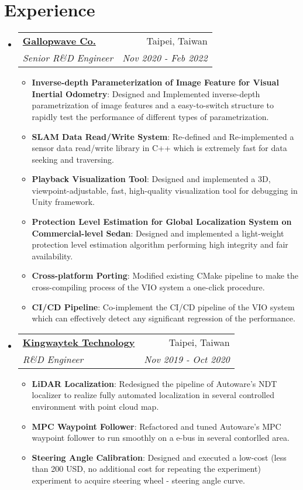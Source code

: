 \documentclass[a4paper,20pt]{article}
\makeatletter
\newcommand{\resumeItem}[2]{
  \item\small{
    \textbf{#1}{: #2 \vspace{-2pt}}
  }
}
\newcommand{\resumeSubheading}[4]{
  \vspace{-1pt}\item
    \begin{tabular*}{0.97\textwidth}{l@{\extracolsep{\fill}}r}
      \textbf{#1} & #2 \\
      \textit{#3} & \textit{#4} \\
    \end{tabular*}\vspace{-5pt}
}
\newcommand{\resumeSubHeadingListStart}{\begin{itemize}[leftmargin=*]}
\newcommand{\resumeSubHeadingListEnd}{\end{itemize}}
\newcommand{\resumeItemListStart}{\begin{itemize}}
\newcommand{\resumeItemListEnd}{\end{itemize}\vspace{-5pt}}
\makeatother
\begin{document}
\section{Experience}
  \resumeSubHeadingListStart
    \resumeSubheading{\href{https://www.gallopwave.com/}{Gallopwave Co.}}{Taipei, Taiwan}
      {Senior R\&D Engineer}{Nov 2020 - Feb 2022}
    \resumeItemListStart
        \resumeItem{Inverse-depth Parameterization of Image Feature for Visual Inertial Odometry}
          {Designed and Implemented inverse-depth parametrization of image features and a easy-to-switch structure to rapidly test the performance of different types of parametrization. }
        \resumeItem{SLAM Data Read/Write System}
          {Re-defined and Re-implemented a sensor data read/write library in C++ which is extremely fast for data seeking and traversing.}
        \resumeItem{Playback Visualization Tool}
          {Designed and implemented a 3D, viewpoint-adjustable, fast, high-quality visualization tool for debugging in Unity framework.}
        \resumeItem{Protection Level Estimation for Global Localization System on Commercial-level Sedan}
          {Designed and implemented a light-weight protection level estimation algorithm performing high integrity and fair availability.}
        \resumeItem{Cross-platform Porting}
          {Modified existing CMake pipeline to make the cross-compiling process of the VIO system a one-click procedure.}
        \resumeItem{CI/CD Pipeline}
          {Co-implement the CI/CD pipeline of the VIO system which can effectively detect any significant regression of the performance.}
      \resumeItemListEnd
    \resumeSubheading{\href{http://www.kingwaytek.com/}{Kingwaytek Technology}}{Taipei, Taiwan}
      {R\&D Engineer}{Nov 2019 - Oct 2020}
		\resumeItemListStart
        \resumeItem{LiDAR Localization}
          {Redesigned the pipeline of Autoware's NDT localizer to realize fully automated localization in several controlled environment with point cloud map.}
        \resumeItem{MPC Waypoint Follower}
          {Refactored and tuned Autoware's MPC waypoint follower to run smoothly on a e-bus in several contorlled area.}
        \resumeItem{Steering Angle Calibration}
          {Designed and executed a low-cost (less than 200 USD, no additional cost for repeating the experiment) experiment to acquire steering wheel - steering angle curve.}
		\resumeItemListEnd
\resumeSubHeadingListEnd

\vspace{-5pt}
\end{document}
